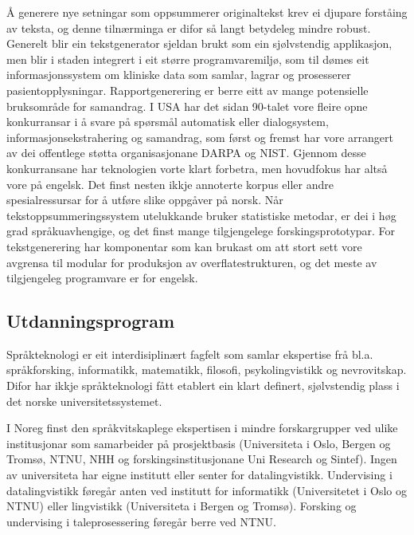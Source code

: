 \begin{multicols}{2}
Å generere nye setningar som oppsummerer originaltekst krev ei djupare forståing av teksta, og denne tilnærminga er difor så langt betydeleg mindre robust. Generelt blir ein tekstgenerator sjeldan brukt som ein sjølvstendig applikasjon, men blir i staden integrert i eit større programvaremiljø, som til dømes eit informasjonssystem om kliniske data som samlar, lagrar og prosesserer pasientopplysningar. Rapportgenerering er berre eitt av mange potensielle bruksområde for samandrag.
I USA har det sidan 90-talet vore fleire opne konkurransar i å svare på spørsmål automatisk eller dialogsystem, informasjonsekstrahering og samandrag, som først og fremst har vore arrangert av dei offentlege støtta organisasjonane DARPA og NIST. Gjennom desse konkurransane har teknologien vorte klart forbetra, men hovudfokus har altså vore på engelsk. 
Det finst nesten ikkje annoterte korpus eller andre spesialressursar for å utføre slike oppgåver på norsk. 
Når tekstoppsummeringssystem utelukkande bruker statistiske metodar, er dei i høg grad språkuavhengige, og det finst mange tilgjengelege forskingsprototypar. 
For tekstgenerering har komponentar som kan brukast om att stort sett vore avgrensa til modular for produksjon av overflatestrukturen, og det meste av tilgjengeleg programvare er for engelsk. 

\subsection{Utdanningsprogram}

Språkteknologi er eit interdisiplinært fagfelt som samlar ekspertise frå bl.a. språkforsking, informatikk, matematikk, filosofi, psykolingvistikk og nevrovitskap.
Difor har ikkje språkteknologi fått etablert ein klart definert, sjølvstendig plass i det norske universitetssystemet. 


I Noreg finst den språkvitskaplege ekspertisen i mindre forskargrupper ved ulike institusjonar som samarbeider på prosjektbasis (Universiteta i Oslo, Bergen og Tromsø, NTNU, NHH og forskingsinstitusjonane Uni Research og Sintef). Ingen av universiteta har eigne institutt eller senter for datalingvistikk. Undervising i datalingvistikk føregår anten ved institutt for informatikk (Universitetet i Oslo og NTNU) eller lingvistikk (Universiteta i Bergen og Tromsø). Forsking og undervising i taleprosessering føregår berre ved NTNU.


\end{multicols}
